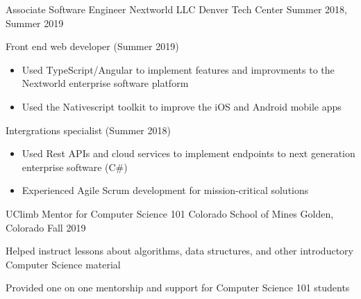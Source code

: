 \vspace{-2.0mm}

\begin{cventries}

  \cventry
    {Associate Software Engineer} %
    {Nextworld LLC} %
    {Denver Tech Center} %
    {Summer 2018, Summer 2019} %
    {
      \begin{cvitems} %
      \item {Front end web developer (Summer 2019)}
      \begin{itemize}
            \item {Used TypeScript/Angular to implement features and
    improvments to the Nextworld enterprise software platform}
        \item {Used the Nativescript toolkit to improve the iOS and
    Android mobile apps}
    \end{itemize}
        \item {Intergrations specialist (Summer 2018)}
        \begin{itemize}
                \item {Used Rest APIs and cloud services to implement
                            endpoints to next generation enterprise software (C\#)}
                                    \item {Experienced Agile Scrum
    development for mission-critical solutions}
    \end{itemize}
      \end{cvitems}
    }

    \cventry
    	{UClimb Mentor for Computer Science 101}
    	{ Colorado School of Mines }
    	{ Golden, Colorado}
	   	 {Fall 2019  }
   	 {
   	 \begin{cvitems}
   	 \item {Helped instruct lessons about algorithms, data structures, and other introductory Computer Science material}
   	 \item {Provided one on one mentorship and support for Computer Science 101 students}
    \end{cvitems}
    }


\end{cventries}
